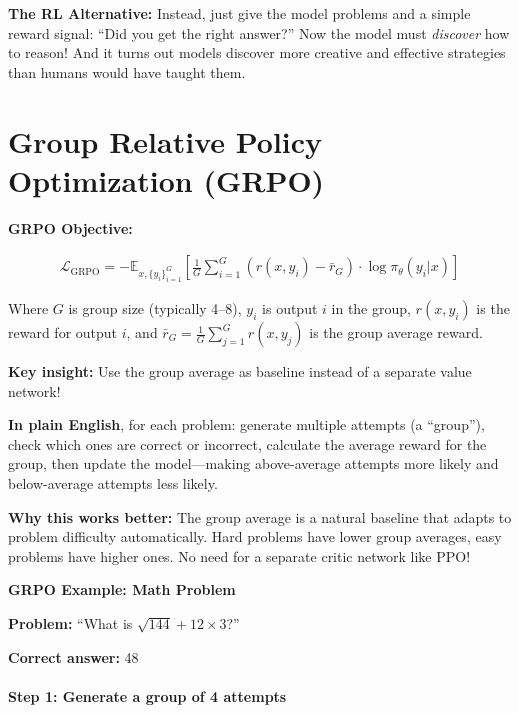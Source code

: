\begin{chapterenv}
\textbf{The RL Alternative:} Instead, just give the model problems and a simple reward signal: ``Did you get the right answer?'' Now the model must \textit{discover} how to reason! And it turns out models discover more creative and effective strategies than humans would have taught them.

\section{Group Relative Policy Optimization (GRPO)}

\begin{infobox}
\textbf{GRPO Objective:}

\begin{align*}
\mathcal{L}_{\text{GRPO}} = -\mathbb{E}_{x,\{y_i\}_{i=1}^G} \left[ \frac{1}{G} \sum_{i=1}^G \left( r(x, y_i) - \bar{r}_G \right) \cdot \log \pi_\theta(y_i | x) \right]
\end{align*}

Where $G$ is group size (typically 4--8), $y_i$ is output $i$ in the group, $r(x, y_i)$ is the reward for output $i$, and $\bar{r}_G = \frac{1}{G}\sum_{j=1}^G r(x, y_j)$ is the group average reward.

\textbf{Key insight:} Use the group average as baseline instead of a separate value network!

\textbf{In plain English}, for each problem: generate multiple attempts (a ``group''), check which ones are correct or incorrect, calculate the average reward for the group, then update the model---making above-average attempts more likely and below-average attempts less likely.

\textbf{Why this works better:} The group average is a natural baseline that adapts to problem difficulty automatically. Hard problems have lower group averages, easy problems have higher ones. No need for a separate critic network like PPO!
\end{infobox}

\textbf{GRPO Example: Math Problem}

\textbf{Problem:} ``What is $\sqrt{144} + 12 \times 3$?''

\textbf{Correct answer:} 48

\paragraph{Step 1: Generate a group of 4 attempts}


\end{chapterenv}
